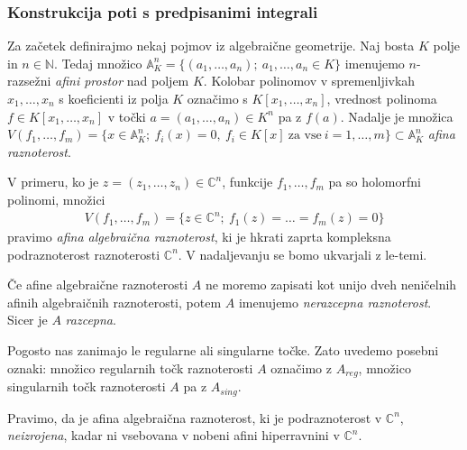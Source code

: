 \documentclass[12pt,a4paper,twoside]{article}
\theoremstyle{definition} %
\theoremstyle{plain} %
\numberwithin{equation}{section}  %
\begin{document}
\subsubsection{Konstrukcija poti s predpisanimi integrali}
%
Za začetek definirajmo nekaj pojmov iz algebraične geometrije. \newline
Naj bosta $K$ polje in $n \in \mathbb{N}$. Tedaj množico $\mathbb{A}_{K}^{n} = \{ (a_{1}, \dots , a_{n}); \ a_{1}, \dots , a_{n} \in K \}$ imenujemo $n$-razsežni \emph{afini prostor} nad poljem $K$.
Kolobar polinomov v spremenljivkah $x_{1}, \dots , x_{n}$ s koeficienti iz polja $K$ označimo s $K[x_{1}, \dots , x_{n}]$, vrednost polinoma $f \in K[x_{1}, \dots , x_{n}]$ v točki $a = (a_{1}, \dots , a_{n}) \in K^{n}$ pa z $f(a)$.
Nadalje je množica $V(f_{1}, \dots , f_{m}) = \{ x \in \mathbb{A}_{K}^{n} ; \ f_{i}(x) = 0, \ f_{i} \in K[x] \ \textrm{za vse} \ i = 1, \dots , m \} \subset \mathbb{A}_{K}^{n}$ \emph{afina raznoterost}.

V primeru, ko je $z = (z_{1}, \dots , z_{n}) \in \mathbb{C}^{n}$, funkcije $f_{1}, \dots , f_{m}$ pa so holomorfni polinomi, množici
\begin{gather}
V(f_{1}, \dots , f_{m}) = \{ z \in \mathbb{C}^{n}; \ f_{1}(z) = \dots = f_{m}(z) = 0 \}
\end{gather}
pravimo \emph{afina algebraična raznoterost}, ki je hkrati zaprta kompleksna podraznoterost raznoterosti $\mathbb{C}^{n}$.
V nadaljevanju se bomo ukvarjali z le-temi.

Če afine algebraične raznoterosti $A$ ne moremo zapisati kot unijo dveh neničelnih afinih algebraičnih raznoterosti, potem $A$ imenujemo \emph{nerazcepna raznoterost}.
Sicer je $A$ \emph{razcepna}.

Pogosto nas zanimajo le regularne ali singularne točke. Zato uvedemo posebni oznaki:
množico regularnih točk raznoterosti $A$ označimo z $A_{reg}$, množico singularnih točk raznoterosti $A$ pa z $A_{sing}$.

Pravimo, da je afina algebraična raznoterost, ki je podraznoterost v $\mathbb{C}^{n}$, \emph{neizrojena}, kadar ni vsebovana v nobeni afini hiperravnini v $\mathbb{C}^{n}$.
\end{document}
